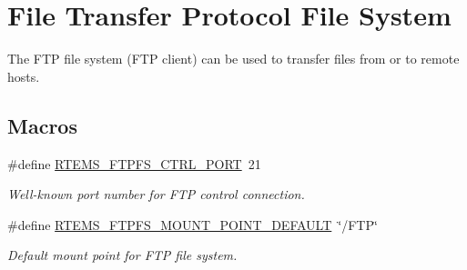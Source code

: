 \hypertarget{group__rtems__ftpfs}{}\section{File Transfer Protocol File System}
\label{group__rtems__ftpfs}


The F\+TP file system (F\+TP client) can be used to transfer files from or to remote hosts.  


\subsection*{Macros}
\begin{DoxyCompactItemize}
\item 
\mbox{\label{group__rtems__ftpfs_ga78cfc83393e18e7b875c57828c6e6a37}} 
\#define \mbox{\hyperlink{group__rtems__ftpfs_ga78cfc83393e18e7b875c57828c6e6a37}{R\+T\+E\+M\+S\+\_\+\+F\+T\+P\+F\+S\+\_\+\+C\+T\+R\+L\+\_\+\+P\+O\+RT}}~21
\begin{DoxyCompactList}\small\item\em Well-\/known port number for F\+TP control connection. \end{DoxyCompactList}\item 
\mbox{\label{group__rtems__ftpfs_ga62b0e39dcbe47ed7a94eb4d44848dda6}} 
\#define \mbox{\hyperlink{group__rtems__ftpfs_ga62b0e39dcbe47ed7a94eb4d44848dda6}{R\+T\+E\+M\+S\+\_\+\+F\+T\+P\+F\+S\+\_\+\+M\+O\+U\+N\+T\+\_\+\+P\+O\+I\+N\+T\+\_\+\+D\+E\+F\+A\+U\+LT}}~\char`\"{}/F\+TP\char`\"{}
\begin{DoxyCompactList}\small\item\em Default mount point for F\+TP file system. \end{DoxyCompactList}\end{DoxyCompactItemize}

